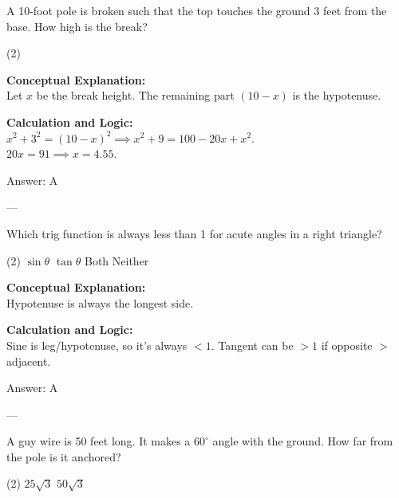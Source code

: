 \documentclass[11pt,paper=a4,answers]{exam}
\begin{document}
\begin{questions}
\question
A 10-foot pole is broken such that the top touches the ground 3 feet from the base. How high is the break?
\begin{tasks}(2)
\end{tasks}

\begin{solution}
\textbf{Conceptual Explanation:} \\
Let $x$ be the break height. The remaining part $(10-x)$ is the hypotenuse.

\vspace{10pt}
\textbf{Calculation and Logic:} \\
$x^2 + 3^2 = (10-x)^2 \implies x^2 + 9 = 100 - 20x + x^2$. \\
$20x = 91 \implies x = 4.55$.

\vspace{15pt}
Answer: \colorbox{yellow!100}{A}
\end{solution}

---

\question
Which trig function is always less than 1 for acute angles in a right triangle?
\begin{tasks}(2)
    \task $\sin \theta$
    \task $\tan \theta$
    \task Both
    \task Neither
\end{tasks}

\begin{solution}
\textbf{Conceptual Explanation:} \\
Hypotenuse is always the longest side.

\vspace{10pt}
\textbf{Calculation and Logic:} \\
Sine is leg/hypotenuse, so it's always $< 1$. Tangent can be $> 1$ if opposite $>$ adjacent.

\vspace{15pt}
Answer: \colorbox{yellow!100}{A}
\end{solution}

---

\question
A guy wire is 50 feet long. It makes a $60^\circ$ angle with the ground. How far from the pole is it anchored?
\begin{tasks}(2)
    \task $25\sqrt{3}$
    \task $50\sqrt{3}$
\end{tasks}


\end{questions}
\end{document}
